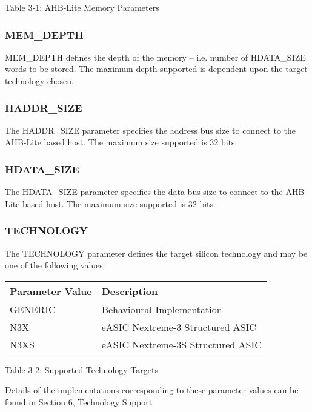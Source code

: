 \protect\hypertarget{_Toc326677729}{}{}Table 3‑1: AHB-Lite Memory
Parameters

\subsubsection{MEM\_DEPTH}\label{mem_depth}

MEM\_DEPTH defines the depth of the memory -- i.e. number of HDATA\_SIZE
words to be stored. The maximum depth supported is dependent upon the
target technology chosen.

\subsubsection{HADDR\_SIZE}\label{haddr_size}

The HADDR\_SIZE parameter specifies the address bus size to connect to
the AHB-Lite based host. The maximum size supported is 32 bits.

\subsubsection{HDATA\_SIZE}\label{hdata_size}

The HDATA\_SIZE parameter specifies the data bus size to connect to the
AHB-Lite based host. The maximum size supported is 32 bits.

\protect\hypertarget{_Toc346451087}{}{\protect\hypertarget{_Toc347141370}{}{\protect\hypertarget{_Ref347483875}{}{}}}

\subsubsection{TECHNOLOGY}\label{technology}

The TECHNOLOGY parameter defines the target silicon technology and may
be one of the following values:

\begin{longtable}[]{@{}ll@{}}
\toprule
Parameter Value & Description\tabularnewline
\midrule
\endhead
GENERIC & Behavioural Implementation\tabularnewline
N3X & eASIC Nextreme-3 Structured ASIC\tabularnewline
N3XS & eASIC Nextreme-3S Structured ASIC\tabularnewline
\bottomrule
\end{longtable}

Table 3‑2: Supported Technology Targets

Details of the implementations corresponding to these parameter values
can be found in Section 6, Technology Support

